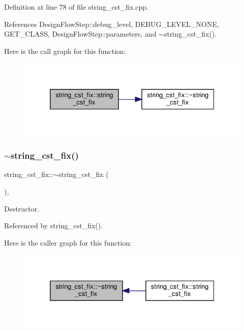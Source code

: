 Definition at line 78 of file string\+\_\+cst\+\_\+fix.\+cpp.



References Design\+Flow\+Step\+::debug\+\_\+level, D\+E\+B\+U\+G\+\_\+\+L\+E\+V\+E\+L\+\_\+\+N\+O\+NE, G\+E\+T\+\_\+\+C\+L\+A\+SS, Design\+Flow\+Step\+::parameters, and $\sim$string\+\_\+cst\+\_\+fix().

Here is the call graph for this function\+:
\nopagebreak
\begin{figure}[H]
\begin{center}
\leavevmode
\includegraphics[width=332pt]{d0/daa/classstring__cst__fix_a361651f7fd62a70ec7f9add6cb687a4c_cgraph}
\end{center}
\end{figure}
\mbox{\label{classstring__cst__fix_ae2a9b955dae6cb7478c80f2326a638f2}} 
\subsubsection{\texorpdfstring{$\sim$string\+\_\+cst\+\_\+fix()}{~string\_cst\_fix()}}
{\footnotesize\ttfamily string\+\_\+cst\+\_\+fix\+::$\sim$string\+\_\+cst\+\_\+fix (\begin{DoxyParamCaption}{ }\end{DoxyParamCaption})\hspace{0.3cm}{\ttfamily [override]}, {\ttfamily [default]}}



Destructor. 



Referenced by string\+\_\+cst\+\_\+fix().

Here is the caller graph for this function\+:
\nopagebreak
\begin{figure}[H]
\begin{center}
\leavevmode
\includegraphics[width=332pt]{d0/daa/classstring__cst__fix_ae2a9b955dae6cb7478c80f2326a638f2_icgraph}
\end{center}
\end{figure}


